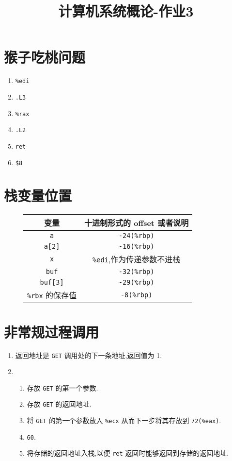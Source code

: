 
\usepackage{../../homeworks_preamble}
\title{计算机系统概论-作业3}


    \maketitle
    \section{猴子吃桃问题}
    \begin{enumerate}
        \item \texttt{\%edi}
        \item \texttt{.L3}
        \item \texttt{\%rax}
        \item \texttt{.L2}
        \item \texttt{ret}
        \item \texttt{\$8}
    \end{enumerate}
    \section{栈变量位置}
    \begin{figure}[htbp]
        \centering
        \begin{tabular}{|c|c|}
            \hline
            变量 & 十进制形式的 offset 或者说明\\\hline
            \texttt{a} & \texttt{-24(\%rbp)}\\\hline
            \texttt{a[2]} & \texttt{-16(\%rbp)}\\\hline
            \texttt{x} & \texttt{\%edi},作为传递参数不进栈\\\hline
            \texttt{buf} & \texttt{-32(\%rbp)}\\\hline
            \texttt{buf[3]} & \texttt{-29(\%rbp)}\\\hline
            \texttt{\%rbx} 的保存值 & \texttt{-8(\%rbp)}\\\hline
        \end{tabular}
    \end{figure}
    \section{非常规过程调用}
    \begin{enumerate}
        \item 返回地址是 \texttt{GET} 调用处的下一条地址,返回值为 1.
        \item
        \begin{enumerate}
            \item 存放 \texttt{GET} 的第一个参数.
            \item 存放 \texttt{GET} 的返回地址.
            \item 将 \texttt{GET} 的第一个参数放入 \texttt{\%ecx} 从而下一步将其存放到 \texttt{72(\%eax)}.
            \item \texttt{60}.
            \item 将存储的返回地址入栈,以便 \texttt{ret} 返回时能够返回到存储的返回地址.
        \end{enumerate}
    \end{enumerate}
